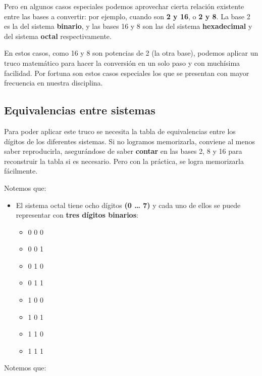 \documentclass[spanish,A4,]{article}
\begin{document}
Pero en algunos casos especiales podemos aprovechar cierta relación
existente entre las bases a convertir: por ejemplo, cuando son \textbf{2
y 16}, o \textbf{2 y 8}. La base 2 es la del sistema \textbf{binario}, y
las bases 16 y 8 son las del sistema \textbf{hexadecimal} y del sistema
\textbf{octal} respectivamente.

En estos casos, como 16 y 8 son potencias de 2 (la otra base), podemos
aplicar un truco matemático para hacer la conversión en un solo paso y
con muchísima facilidad. Por fortuna son estos casos especiales los que
se presentan con mayor frecuencia en nuestra disciplina.

\subsection{Equivalencias entre
sistemas}\label{equivalencias-entre-sistemas}

Para poder aplicar este truco se necesita la tabla de equivalencias
entre los dígitos de los diferentes sistemas. Si no logramos
memorizarla, conviene al menos saber reproducirla, asegurándose de saber
\textbf{contar} en las bases 2, 8 y 16 para reconstruir la tabla si es
necesario. Pero con la práctica, se logra memorizarla fácilmente.

Notemos que:

\begin{itemize}
\itemsep1pt\parskip0pt
\item
  El sistema octal tiene ocho dígitos \textbf{(0 \ldots{} 7)} y cada uno
  de ellos se puede representar con \textbf{tres dígitos binarios}:

  \begin{itemize}
  \itemsep1pt\parskip0pt
  \item
    0 0 0
  \item
    0 0 1
  \item
    0 1 0
  \item
    0 1 1
  \item
    1 0 0
  \item
    1 0 1
  \item
    1 1 0
  \item
    1 1 1
  \end{itemize}
\end{itemize}

Notemos que:
\end{document}
